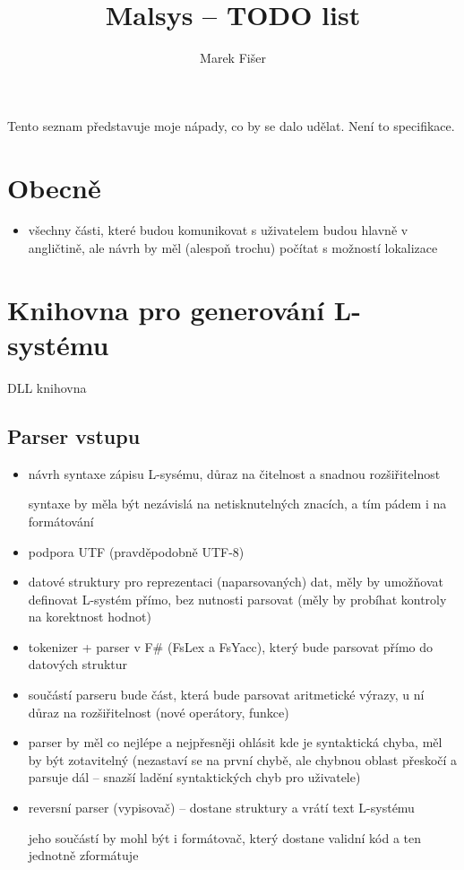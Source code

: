 \documentclass[12pt, a4paper]{article}
\title{Malsys -- TODO list}
\author{Marek Fišer}
\begin{document}
\maketitle

Tento seznam představuje moje nápady, co by se dalo udělat. Není to specifikace.


\section{Obecně}
\begin{itemize}
	\item všechny části, které budou komunikovat s uživatelem budou hlavně v angličtině, ale návrh by měl (alespoň trochu) počítat s možností lokalizace
\end{itemize}


\section{Knihovna pro generování L-systému}
DLL knihovna

\subsection{Parser vstupu}
\begin{itemize}
	\item návrh syntaxe zápisu L-sysému, důraz na čitelnost a snadnou rozšiřitelnost
		
		syntaxe by měla být nezávislá na netisknutelných znacích, a tím pádem i na formátování
	
	\item podpora UTF (pravděpodobně UTF-8)

	\item datové struktury pro reprezentaci  (naparsovaných) dat, měly by umožňovat definovat L-systém přímo, bez nutnosti parsovat (měly by probíhat kontroly na korektnost hodnot)
	
	\item tokenizer + parser v F\# (FsLex a FsYacc), který bude parsovat přímo do datových struktur
	
	\item součástí parseru bude část, která bude parsovat aritmetické výrazy, u ní důraz na rozšiřitelnost (nové operátory, funkce)
	
	\item parser by měl co nejlépe a nejpřesněji ohlásit kde je syntaktická chyba, měl by být zotavitelný (nezastaví se na první chybě, ale chybnou oblast přeskočí a parsuje dál -- snazší ladění syntaktických chyb pro uživatele)
	
	\item reversní parser (vypisovač) -- dostane struktury a vrátí text L-systému
	
		jeho součástí by mohl být i formátovač, který dostane validní kód a ten jednotně zformátuje
\end{itemize}
\end{document}
